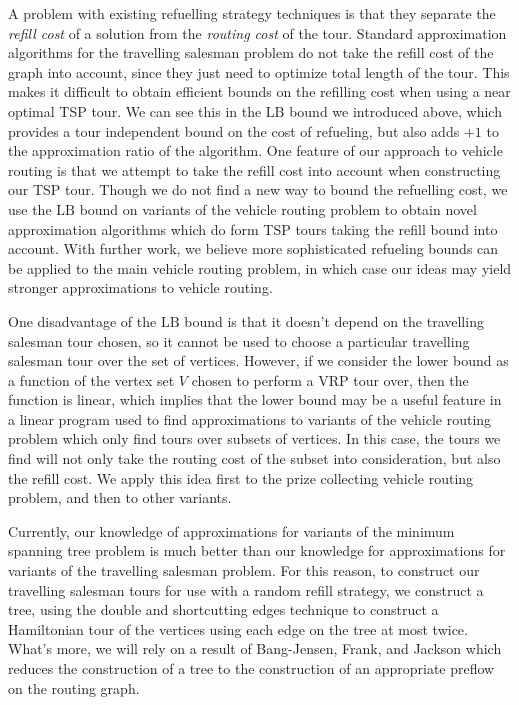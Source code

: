 \documentclass{article}
\theoremstyle{plain}
\theoremstyle{plain}
\begin{document}
A problem with existing refuelling strategy techniques is that they separate the {\it refill cost} of a solution from the {\it routing cost} of the tour. Standard approximation algorithms for the travelling salesman problem do not take the refill cost of the graph into account, since they just need to optimize total length of the tour. This makes it difficult to obtain efficient bounds on the refilling cost when using a near optimal TSP tour. We can see this in the $\text{LB}$ bound we introduced above, which provides a tour independent bound on the cost of refueling, but also adds $+1$ to the approximation ratio of the algorithm. One feature of our approach to vehicle routing is that we attempt to take the refill cost into account when constructing our TSP tour. Though we do not find a new way to bound the refuelling cost, we use the $\text{LB}$ bound on variants of the vehicle routing problem to obtain novel approximation algorithms which do form TSP tours taking the refill bound into account. With further work, we believe more sophisticated refueling bounds can be applied to the main vehicle routing problem, in which case our ideas may yield stronger approximations to vehicle routing.

One disadvantage of the $\text{LB}$ bound is that it doesn't depend on the travelling salesman tour chosen, so it cannot be used to choose a particular travelling salesman tour over the set of vertices. However, if we consider the lower bound as a function of the vertex set $V$ chosen to perform a VRP tour over, then the function is linear, which implies that the lower bound may be a useful feature in a linear program used to find approximations to variants of the vehicle routing problem which only find tours over subsets of vertices. In this case, the tours we find will not only take the routing cost of the subset into consideration, but also the refill cost. We apply this idea first to the prize collecting vehicle routing problem, and then to other variants.

Currently, our knowledge of approximations for variants of the minimum spanning tree problem is much better than our knowledge for approximations for variants of the travelling salesman problem. For this reason, to construct our travelling salesman tours for use with a random refill strategy, we construct a tree, using the double and shortcutting edges technique to construct a Hamiltonian tour of the vertices using each edge on the tree at most twice. What's more, we will rely on a result of Bang-Jensen, Frank, and Jackson which reduces the construction of a tree to the construction of an appropriate preflow on the routing graph.
\end{document}

